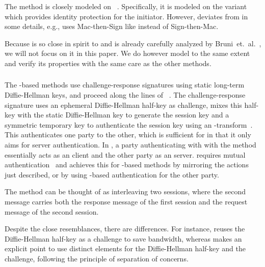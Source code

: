 \subsubsection{\mSigma{}}
\label{sec:sigma}
The \mSigSig{} method is closely modeled on \mSigma{}~\cite{sigma}.
%
Specifically, it is modeled on the \mSigmaI{} variant which provides identity
protection for the initiator.
%
However, \mSigSig{} deviates from \mSigmaI{} in some details, e.g.,
\mEdhoc{} uses Mac-then-Sign like \mTls{} instead of Sign-then-Mac.
%

Because \mSigSig{} is so close in spirit to \mSigmaI{} and is already carefully
analyzed by Bruni~et.~al.~\cite{DBLP:conf/secsr/BruniJPS18}, we will not focus
on it in this paper.
%
We do however model \mSigSig{} to the same extent and
verify its properties with the same care as the other methods.
%

\subsubsection{\mOptls{}}
\label{sec:optls}
The \mStat-based methods use challenge-response signatures using static
long-term Diffie-Hellman keys, and proceed along the lines of
\mOptls~\cite{cryptoeprint:2015:978}.
%
The challenge-response signature uses an ephemeral Diffie-Hellman half-key as
challenge, mixes this half-key with the static Diffie-Hellman key to generate
the session key and a symmetric temporary key to authenticate the session key
using an \mAead{}-transform~\cite{aead,rfc5116,DBLP:conf/eurosp/KrawczykW16}.
%
This authenticates one party to the other, which is sufficient for \mOptls in
that it only aims for server authentication.
%
In \mEdhoc, a party authenticating with with the \mStat{} method
essentially acts as an \mOptls{} client and the other party as an \mOptls{}
server.
%
\mEdhoc{} requires mutual authentication~\cite{ietf-lake-reqs-04} and achieves
this for \mStat{}-based methods by mirroring the actions just described, or
by using \mSig{}-based authentication for the other party.
%

The \mStatStat{} method can be thought of as interleaving two \mOptls{}
sessions, where the second \mEdhoc{} message carries both the response
message of the first \mOptls{} session and the request message of the second
\mOptls{} session.
%

Despite the close resemblances, there are differences.
%
For instance, \mEdhoc{} reuses the Diffie-Hellman half-key as a challenge to
save bandwidth, whereas \mOptls{} makes an explicit
point to use distinct elements for the Diffie-Hellman half-key and the
challenge, following the principle of separation of concerns.
%

